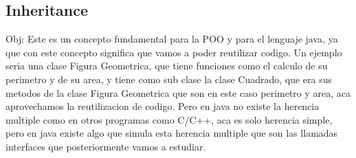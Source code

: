 \subsection{Inheritance}

Obj: Este es un concepto fundamental para la POO y para el lenguaje java, ya que con este concepto significa que vamos a poder reutilizar codigo. Un ejemplo seria una clase Figura Geometrica, que tiene funciones como el calculo de su perimetro y de su area, y tiene como sub clase la clase Cuadrado, que era sus metodos de la clase Figura Geometrica que son en este caso perimetro y area, aca aprovechamos la reutilizacion de codigo. Pero en java no existe la herencia multiple como en otros programas como C/C++, aca es solo herencia simple, pero en java existe algo que simula esta herencia multiple que son las llamadas interfaces que posteriormente vamos a estudiar.
